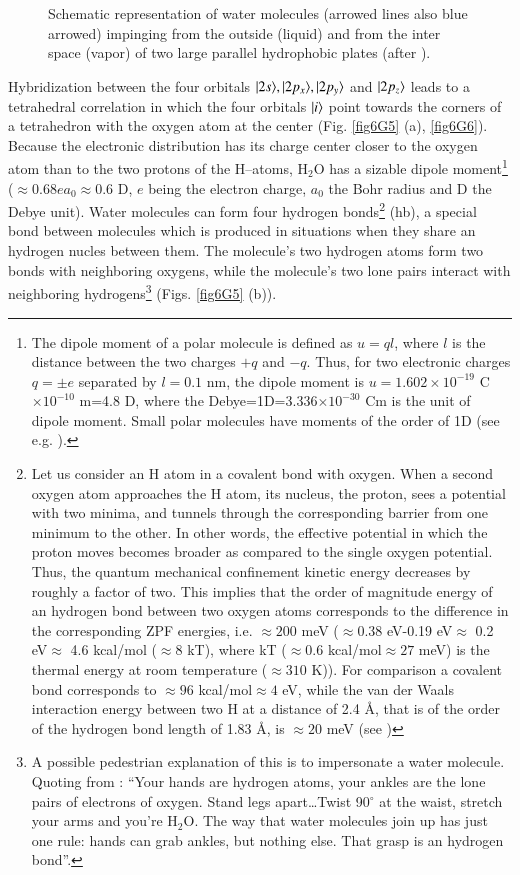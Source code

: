 \begin{subappendices}
\begin{figure}
\caption{Schematic representation of water molecules (arrowed lines also blue arrowed) impinging from the outside (liquid) and from the inter space (vapor) of two large parallel hydrophobic plates (after \cite{Lum:99}).}\label{fig6G8}
\end{figure}
Hybridization between the four orbitals $|{2s} \rangle,|{2p_x} \rangle,|{2p_y} \rangle$ and $|{2p_z} \rangle$ leads to a tetrahedral correlation in which the four orbitals $|{i} \rangle$ point towards the corners of a tetrahedron with the oxygen atom at the center (Fig. \ref{fig6G5} (a), \ref{fig6G6}). Because the electronic distribution has its charge center closer to the oxygen atom than to the two protons of the H--atoms, H$_2$O has a sizable dipole moment\footnote{The dipole moment of a polar molecule is defined as $u=ql$, where $l$ is the distance between the two charges $+q$ and $-q$. Thus, for two electronic charges $q=\pm e$ separated by $l=0.1$ nm, the dipole moment is $u=1.602\times 10^{-19}$ C$\times10^{-10}$ m=4.8 D, where the Debye=1D=3.336$\times10^{-30}$ Cm is the unit of dipole moment. Small polar molecules have moments of the order of 1D (see e.g. \cite{Israelachvili:85}). } ($\approx 0.68 ea_0\approx0.6$ D, $e$ being the electron charge, $a_0$ the Bohr radius and D the Debye unit). Water molecules can form four hydrogen bonds\footnote{Let us consider an H atom in a covalent bond with oxygen. When a second oxygen atom approaches the H atom, its nucleus, the proton, sees a potential with two minima, and tunnels through the corresponding barrier from one minimum to the other. In other words, the effective potential in which the proton moves becomes broader as compared to the single oxygen potential. Thus, the quantum mechanical confinement kinetic energy decreases by roughly a factor of two. This implies that the order of magnitude energy of an hydrogen bond between two oxygen atoms corresponds to the difference in the corresponding ZPF energies, i.e. $\approx200$ meV ($\approx 0.38$ eV-0.19 eV$\approx$ 0.2 eV$\approx$ 4.6 kcal/mol ($\approx8$ kT), where kT ($\approx0.6$ kcal/mol$\approx27$ meV) is the thermal energy at room temperature ($\approx310$ K)). For comparison a covalent  bond corresponds to $\approx96$ kcal/mol$\approx4$ eV, while the van der Waals interaction energy between two H at a distance of 2.4 \AA, that is of the order of the hydrogen bond length of 1.83 \AA,  is $\approx20$ meV (see \cite{Povh:02})} (hb), a special bond between molecules which is produced in situations when they share an hydrogen nucles between them. The molecule's two hydrogen atoms form two bonds with neighboring oxygens, while the molecule's two lone pairs interact with neighboring hydrogens\footnote{A possible pedestrian explanation of this is to impersonate a water molecule. Quoting from \cite{Ball:03}: ``Your hands are hydrogen atoms, your ankles are the lone pairs of electrons of oxygen. Stand legs apart\dots Twist 90$^\circ$ at the waist, stretch your arms and you're H$_2$O. The way that water molecules join up has just one rule: hands can grab ankles, but nothing else. That grasp is an hydrogen bond''.} (Figs. \ref{fig6G5} (b)). 



\end{subappendices}
